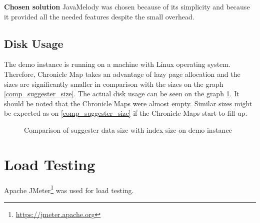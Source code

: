 \textbf{Chosen solution} JavaMelody was chosen because of its simplicity and because it provided all the needed
features despite the small overhead.

\subsection{Disk Usage}
The demo instance is running on a machine with Linux operating system. Therefore, Chronicle Map takes an advantage of
lazy page allocation and the sizes are significantly smaller in comparison with the sizes on the graph \ref{comp_suggester_size}.
The actual disk usage can be seen on the graph \ref{comp_suggester_size_demo}.
It should be noted that the Chronicle Maps were almost empty.
Similar sizes might be expected as on \ref{comp_suggester_size} if the Chronicle Maps start to fill up.

\begin{figure}[htbp]
    \centering
    \caption{Comparison of suggester data size with index size on demo instance}
    \label{comp_suggester_size_demo}
\end{figure}

\section{Load Testing}
Apache JMeter\footnote{\url{https://jmeter.apache.org}} was used for load testing.
